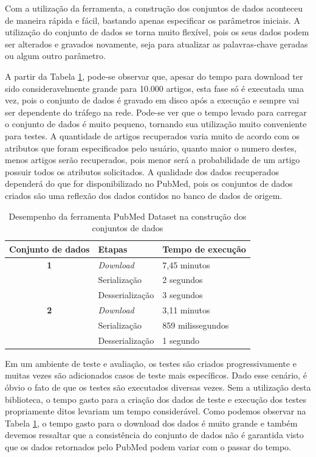 Com a utilização da ferramenta, a construção dos conjuntos de dados aconteceu de maneira
rápida e fácil, bastando apenas especificar os parâmetros iniciais. A utilização do conjunto de
dados se torna muito flexível, pois os seus dados podem ser alterados e gravados novamente,
seja para atualizar as palavras-chave geradas ou algum outro parâmetro.

A partir da Tabela \ref{tab:tempoExecucao}, pode-se observar que, apesar do tempo para download ter sido
consideravelmente grande para 10.000 artigos, esta fase só é executada uma vez, pois o
conjunto de dados é gravado em disco após a execução e sempre vai ser dependente do tráfego
na rede. Pode-se ver que o tempo levado para carregar o conjunto de dados é muito pequeno,
tornando sua utilização muito conveniente para testes. A quantidade de artigos recuperados
varia muito de acordo com os atributos que foram especificados pelo usuário, quanto maior o
numero destes, menos artigos serão recuperados, pois menor será a probabilidade de um artigo
possuir todos os atributos solicitados. A qualidade dos dados recuperados dependerá do que for
disponibilizado no PubMed, pois os conjuntos de dados criados são uma reflexão dos dados
contidos no banco de dados de origem.

\begin{table}[htbp]
\center
\begin{tabular}{|l|l|l|}
\hline
\textbf{Conjunto de dados} & \textbf{Etapas} & \textbf{Tempo de execução} \\ \hline
\multicolumn{ 1}{|c|}{\textbf{1}} & \textit{Download} & 7,45 minutos \\ \cline{ 2- 3}
\multicolumn{ 1}{|l|}{} & Serialização & 2 segundos \\ \cline{ 2- 3}
\multicolumn{ 1}{|l|}{} & Desserialização & 3 segundos \\ \hline
\multicolumn{ 1}{|c|}{\textbf{2}} & \textit{Download} & 3,11 minutos \\ \cline{ 2- 3}
\multicolumn{ 1}{|l|}{} & Serialização & 859 milissegundos \\ \cline{ 2- 3}
\multicolumn{ 1}{|l|}{} & Desserialização & 1 segundo \\ \hline
\end{tabular}
\caption{Desempenho da ferramenta PubMed Dataset na construção dos conjuntos de dados}
\label{tab:tempoExecucao}
\end{table}

Em um ambiente de teste e avaliação, os testes são criados progressivamente e muitas vezes são adicionados casos de teste mais específicos. Dado esse cenário, é óbvio o fato de que os testes são executados diversas vezes. Sem a utilização desta biblioteca, o tempo gasto para a criação dos dados de teste e execução dos testes propriamente ditos levariam um tempo
considerável. Como podemos observar na Tabela \ref{tab:tempoExecucao}, o tempo gasto para o download dos dados é muito grande e também devemos ressaltar que a consistência do conjunto de dados não é garantida visto que os dados retornados pelo PubMed podem variar com o passar do tempo.

